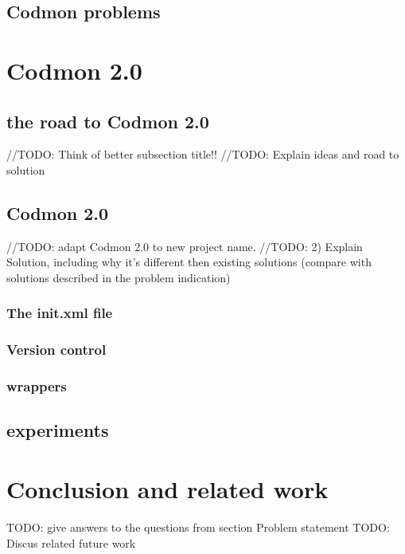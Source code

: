 \documentclass[a4paper,10pt]{scrartcl}
\newcommand{\project}{Codmon 2.0}
\begin{document}
\subsection{Codmon problems}
\label{subsec:CodmonProblems}

\newpage
\section{\project{}}
\label{sec:Codmon2.0}

\subsection{the road to \project{}}
//TODO: Think of better subsection title!!
//TODO: Explain ideas and road to solution

\subsection{Codmon 2.0}
//TODO: adapt Codmon 2.0 to new project name.
//TODO: 2) Explain Solution, including why it's different then existing solutions (compare with solutions described in the problem indication)

\subsubsection{The init.xml file}
\label{subsec:init}

\subsubsection{Version control}
\label{subsec:versionControl}

\subsubsection{wrappers}
\label{subsec:wrappers}

\subsection{experiments}
\label{sec:experiments}

\newpage

\section{Conclusion and related work}
\label{sec:conclusion}
TODO: give answers to the questions from section Problem statement
TODO: Discus related future work
\newpage


\end{document}
